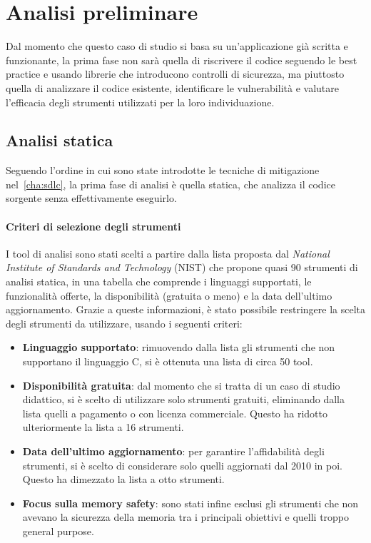 \section{Analisi preliminare}
\label{sec:initial_analysis}

Dal momento che questo caso di studio si basa su un'applicazione già scritta e funzionante,
la prima fase non sarà quella di riscrivere il codice seguendo le best practice
e usando librerie che introducono controlli di sicurezza, ma piuttosto quella di
analizzare il codice esistente, identificare le vulnerabilità e valutare l'efficacia
degli strumenti utilizzati per la loro individuazione.

\subsection*{Analisi statica}
Seguendo l'ordine in cui sono state introdotte le tecniche di mitigazione nel~\autoref{cha:sdlc},
la prima fase di analisi è quella statica, che analizza il codice sorgente senza
effettivamente eseguirlo.

\paragraph{Criteri di selezione degli strumenti}
I tool di analisi sono stati scelti a partire dalla lista proposta dal \textit{National
Institute of Standards and Technology} (NIST)\cite{nist_sast_list} che propone quasi
90 strumenti di analisi statica, in una tabella che comprende i linguaggi
supportati, le funzionalità offerte, la disponibilità (gratuita o meno) e la
data dell'ultimo aggiornamento. Grazie a queste informazioni, è stato possibile
restringere la scelta degli strumenti da utilizzare, usando i seguenti criteri:
\begin{itemize}
  \item \textbf{Linguaggio supportato}: rimuovendo dalla lista gli strumenti che
    non supportano il linguaggio C, si è ottenuta una lista di circa 50 tool.

  \item \textbf{Disponibilità gratuita}: dal momento che si tratta di un caso di
    studio didattico, si è scelto di utilizzare solo strumenti gratuiti, eliminando
    dalla lista quelli a pagamento o con licenza commerciale. Questo ha ridotto
    ulteriormente la lista a 16 strumenti.

  \item \textbf{Data dell'ultimo aggiornamento}: per garantire l'affidabilità degli
    strumenti, si è scelto di considerare solo quelli aggiornati dal 2010 in poi.
    Questo ha dimezzato la lista a otto strumenti.

  \item \textbf{Focus sulla memory safety}: sono stati infine esclusi gli strumenti
    che non avevano la sicurezza della memoria tra i principali obiettivi e quelli
    troppo general purpose.
\end{itemize}

